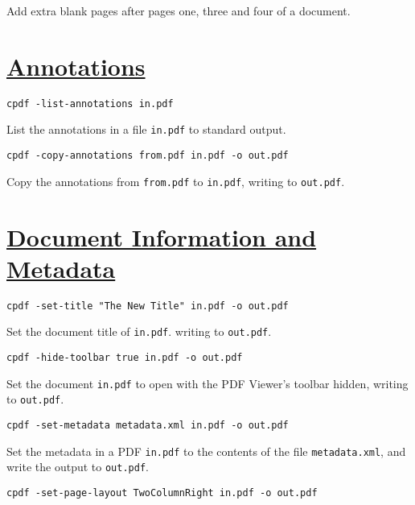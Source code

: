 \documentclass{book}
\begin{document}
\noindent Add extra blank pages after pages one, three and four of a document.

\section*{\hyperref[chap:10]{Annotations}}

\begin{framed}\noindent\texttt{cpdf -list-annotations in.pdf}\end{framed}

\noindent List the annotations in a file \texttt{in.pdf} to standard output.

\begin{framed}\noindent\texttt{cpdf -copy-annotations from.pdf in.pdf -o out.pdf}\end{framed}

\noindent Copy the annotations from \texttt{from.pdf} to \texttt{in.pdf}, writing to \texttt{out.pdf}.

\section*{\hyperref[chap:11]{Document Information and Metadata}}

\begin{framed}\noindent\texttt{cpdf -set-title "The New Title" in.pdf -o out.pdf}\end{framed}

\noindent Set the document title of \texttt{in.pdf}. writing to \texttt{out.pdf}.

\begin{framed}\noindent\texttt{cpdf -hide-toolbar true in.pdf -o out.pdf}\end{framed}

\noindent Set the document \texttt{in.pdf} to open with the PDF Viewer's toolbar hidden, writing to \texttt{out.pdf}.

\begin{framed}\noindent\texttt{cpdf -set-metadata metadata.xml in.pdf -o out.pdf}\end{framed}

\noindent Set the metadata in a PDF \texttt{in.pdf} to the contents of the file \texttt{metadata.xml}, and write the output to \texttt{out.pdf}.

\begin{framed}\noindent\texttt{cpdf -set-page-layout TwoColumnRight in.pdf -o out.pdf}\end{framed}
\end{document}

